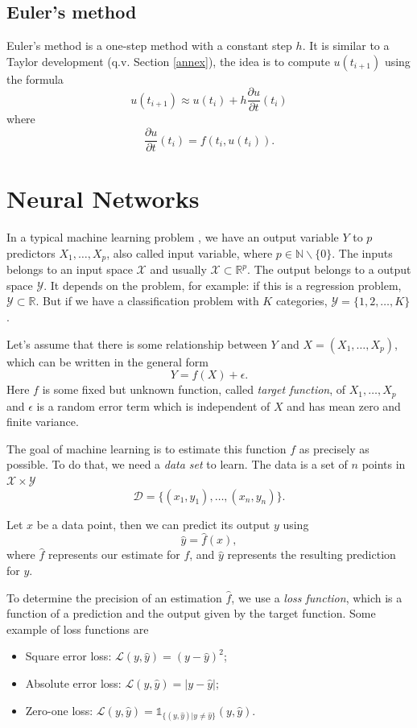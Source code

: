 \documentclass[10pt,a4paper]{article}
\theoremstyle{definition}
\theoremstyle{definition}
\theoremstyle{definition}
\begin{document}
\subsection{Euler's method} \label{euler}
Euler's method is a one-step method with a constant step $h$. It is similar to a Taylor development (q.v. Section \ref{annex}), the idea is to compute $u(t_{i+1})$ using the formula
\begin{equation}\label{eqeuler}
u(t_{i+1}) \approx u(t_i) + h\frac{\partial u}{\partial t}(t_i)
\end{equation}
where 
$$
\frac{\partial u}{\partial t}(t_i) = f(t_i, u(t_i)).
$$


\section{Neural Networks}
In a typical machine learning problem \cite{10}, we have an output variable $Y$ to $p$ predictors $X_1,\dots, X_p$, also called input variable, where $p\in \mathbb{N}\backslash \{0\}$. The inputs belongs to an input space $\mathcal{X}$ and usually $\mathcal{X} \subset \mathbb{R}^p$. The output belongs to a output space $\mathcal{Y}$. It depends on the problem, for example: if this is a regression problem, $\mathcal{Y} \subset \mathbb{R}$. But if we have a classification problem with $K$ categories, $\mathcal{Y} = \{1,2,\dots, K\}$.

Let's assume that there is some relationship between $Y$ and $X = (X_1,\dots, X_p)$, which can be written in the general form
$$
Y = f(X) + \epsilon.
$$
Here $f$ is some fixed but unknown function, called \textit{target function}, of $X_1, \dots, X_p$ and $\epsilon$ is a random error term which is independent of $X$ and has mean zero and finite variance.

The goal of machine learning is to estimate this function $f$ as precisely as possible. To do that, we need a \textit{data set} to learn. The data is a set of $n$ points in $\mathcal{X} \times \mathcal{Y}$
$$
\mathcal{D} = \{(x_1, y_1),\dots, (x_n,y_n)\}.
$$

Let $x$ be a data point, then we can predict its output $y$ using 
$$
\hat{y} = \hat{f}(x),
$$
where $\hat{f}$ represents our estimate for $f$, and $\hat{y}$ represents the resulting prediction for $y$.

To determine the precision of an estimation $\hat{f}$, we use a \textit{loss function}, which is a function of a prediction and the output given by the target function. Some example of loss functions are
\begin{itemize}
\item Square error loss: $\mathcal{L}(y, \hat{y}) = (y-\hat{y})^2$;
\item Absolute error loss: $\mathcal{L}(y, \hat{y}) = |y - \hat{y}|$;
\item Zero-one loss: $\mathcal{L}(y, \hat{y}) = \mathds{1}_{\{(y, \hat{y}) | y\neq \hat{y}\}}(y, \hat{y})$.
\end{itemize}
\end{document}
